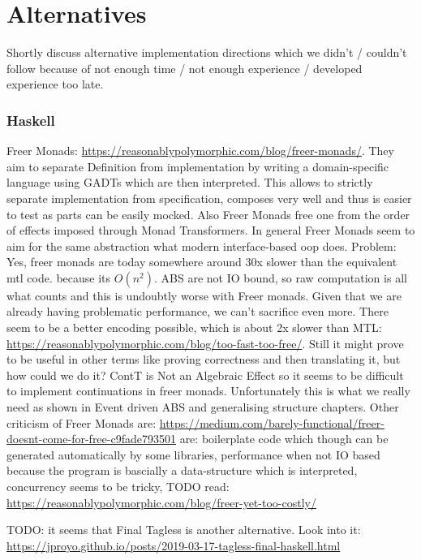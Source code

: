\chapter{Alternatives}
\label{sec:alternatives}

Shortly discuss alternative implementation directions which we didn't / couldn't follow because of not enough time / not enough experience / developed experience too late. 

\subsection{Haskell}
Freer Monads: \url{https://reasonablypolymorphic.com/blog/freer-monads/}. They aim to separate Definition from implementation by writing a domain-specific language using GADTs which are then interpreted. This allows to strictly separate implementation from specification, composes very well and thus is easier to test as parts can be easily mocked. Also Freer Monads free one from the order of effects imposed through Monad Transformers. In general Freer Monads seem to aim for the same abstraction what modern interface-based oop does.
Problem: Yes, freer monads are today somewhere around 30x slower than the equivalent mtl code. because its $O(n^2)$. ABS are not IO bound, so raw computation is all what counts and this is undoubtly worse with Freer monads. Given that we are already having problematic performance, we can't sacrifice even more. There seem to be a better encoding possible, which is about 2x slower than MTL: \url{https://reasonablypolymorphic.com/blog/too-fast-too-free/}. Still it might prove to be useful in other terms like proving correctness and then translating it, but how could we do it?  
ContT is Not an Algebraic Effect so it seems to be difficult to implement continuations in freer monads. Unfortunately this is what we really need as shown in Event driven ABS and generalising structure chapters.
Other criticism of Freer Monads are: \url{https://medium.com/barely-functional/freer-doesnt-come-for-free-c9fade793501} are: boilerplate code which though can be generated automatically by some libraries, performance when not IO based because the program is bascially a data-structure which is interpreted, concurrency seems to be tricky, 
TODO read: \url{https://reasonablypolymorphic.com/blog/freer-yet-too-costly/}


TODO: it seems that Final Tagless is another alternative. Look into it: \url{https://jproyo.github.io/posts/2019-03-17-tagless-final-haskell.html}

